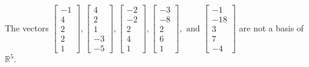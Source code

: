 \begin{exercise}
\begin{exerciseStatement}
  \end{exerciseStatement}
  \begin{exerciseAnswer}
   The vectors \(\left[\begin{array}{r}
-1 \\
4 \\
2 \\
2 \\
1
\end{array}\right] , \left[\begin{array}{r}
4 \\
2 \\
1 \\
-3 \\
-5
\end{array}\right] , \left[\begin{array}{r}
-2 \\
-2 \\
2 \\
4 \\
1
\end{array}\right] , \left[\begin{array}{r}
-3 \\
-8 \\
2 \\
6 \\
1
\end{array}\right] , \text{ and } \left[\begin{array}{r}
-1 \\
-18 \\
3 \\
7 \\
-4
\end{array}\right]\) 
  	 are not  a basis of \(\mathbb{R}^5\).
  


  \end{exerciseAnswer}
\end{exercise}